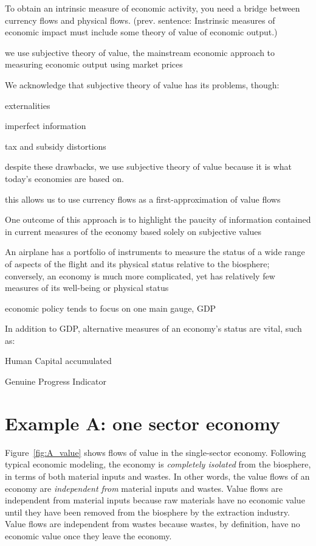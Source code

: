 \begin{outline}[enumerate]
\1 To obtain an intrinsic measure of economic activity, you need a bridge between currency flows and physical flows.  (prev. sentence: Instrinsic measures of economic impact must include some theory of value of economic output.)

	\2 we use subjective theory of value, the mainstream economic approach to measuring economic output using market prices

	\2 We acknowledge that subjective theory of value has its problems, though:

		\3 externalities

		\3 imperfect information

		\3 tax and subsidy distortions

	\2 despite these drawbacks, we use subjective theory of value because it is what today's economies are based on.

	\2 this allows us to use currency flows as a first-approximation of value flows

\1 One outcome of this approach is to highlight the paucity of information contained in current measures of the economy based solely on subjective values

	\2 An airplane has a portfolio of instruments to measure the status of a wide range of aspects of the flight and its physical status relative to the biosphere; conversely, an economy is much more complicated, yet has relatively few measures of its well-being or physical status

	\2 economic policy tends to focus on one main gauge, GDP

	\2 In addition to GDP, alternative measures of an economy's status are vital, such as:

		\3 Human Capital accumulated

		\3 Genuine Progress Indicator

\end{outline}


\section{Example A: one sector economy}

Figure~\ref{fig:A_value} shows flows of value in the single-sector economy.
Following typical economic modeling, 
the economy is \emph{completely isolated} from the biosphere,
in terms of both material inputs and wastes.
In other words, the value flows of an economy are \emph{independent from}
material inputs and wastes.
Value flows are independent from material inputs
because raw materials have no economic value 
until they have been removed from the biosphere by the extraction industry.
Value flows are independent from wastes
because wastes, by definition, have no economic value 
once they leave the economy.

